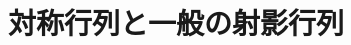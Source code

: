 \documentclass[../../../topic_linear-algebra]{subfiles}
\begin{document}
\sectionline
\section{対称行列と一般の射影行列}

\todo{}
\end{document}
